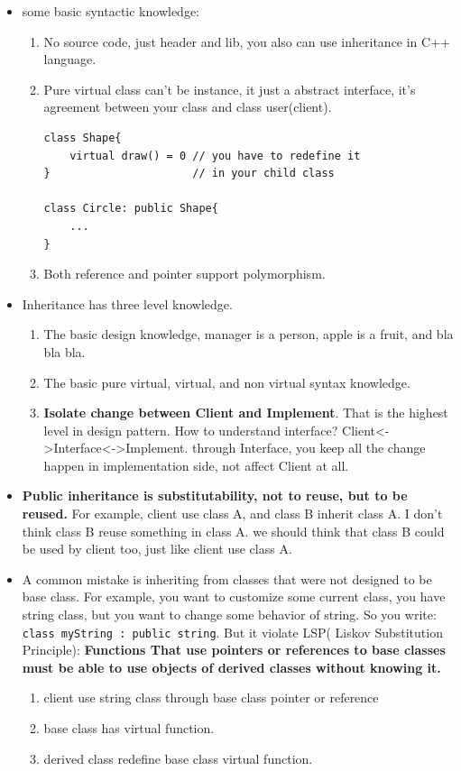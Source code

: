 \documentclass[a4paper,11pt,twoside]{book}
\begin{document}
\begin{itemize}
	\item some basic syntactic knowledge:
	\begin{enumerate}
		\item No source code, just header and lib, you also can use inheritance in C++ language.
		
		\item Pure virtual class can't be instance, it just a abstract interface, it's agreement between your class and class user(client).
\begin{lstlisting}[numbers=none]
class Shape{
	virtual draw() = 0 // you have to redefine it
}					   // in your child class
			
class Circle: public Shape{
	...
}
\end{lstlisting}
		
		\item Both reference and pointer support polymorphism.
	\end{enumerate}
	
	\item Inheritance has three level knowledge.
	\begin{enumerate}
		\item The basic design knowledge, manager is a person, apple is a fruit, and bla bla bla.
		
		\item The basic  pure virtual, virtual, and non virtual syntax knowledge.
		
		\item \textbf{Isolate change between Client and Implement}. That is the highest level in design pattern. How to understand interface? Client<->Interface<->Implement. through Interface, you keep all the change happen in implementation side, not affect Client at all.
	\end{enumerate}
	
	\item \textbf{Public inheritance is substitutability, not to reuse, but to be reused. } For example, client use class A, and class B inherit class A.  I don't think class B reuse something in class A. we should think that class B could be used by client too, just like client use class A.

	
	\item  A common mistake is inheriting from classes that were not designed to be base class. For example, you want to customize some current class, you have string class, but you want to change some behavior of string. So you write: \texttt{class myString : public string}. But it violate LSP( Liskov Substitution Principle): \textbf{Functions That use pointers or references to base classes must be able to use objects of derived classes without knowing it. }
	\begin{enumerate}
		\item client use string class through base class pointer or reference
		\item base class has virtual function.
		\item derived class redefine base class virtual function.
	\end{enumerate}
	

\end{itemize}
\end{document}
